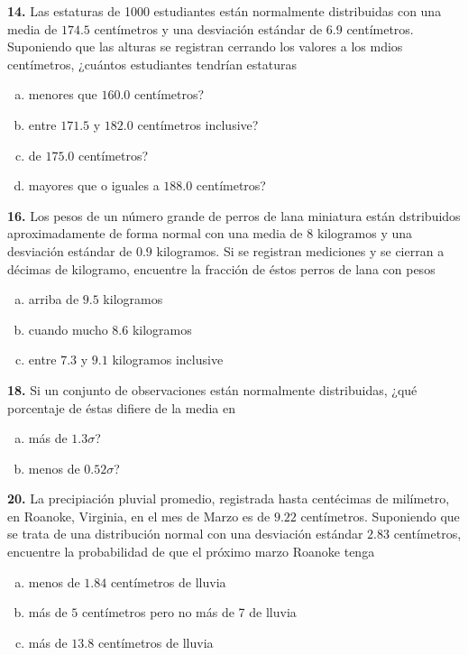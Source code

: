 \documentclass[12pt, letterpaper]{article}
\begin{document}
    \textbf{14. }Las estaturas de 1000 estudiantes están normalmente distribuidas con una media de $174.5$ centímetros y
    una desviación estándar de $6.9$ centímetros. Suponiendo  que las alturas se registran cerrando los valores a los mdios
    centímetros, ¿cuántos estudiantes tendrían estaturas
        \begin{enumerate}[a)]
            \item menores que $160.0$ centímetros?
            \item entre $171.5$ y $182.0$ centímetros inclusive?
            \item de $175.0$ centímetros?
            \item mayores que o iguales a $188.0$ centímetros?
        \end{enumerate}\vskip1cm

    \textbf{16. }Los pesos de un número grande de perros de lana miniatura están dstribuidos aproximadamente de forma normal
    con una media de $8$ kilogramos y  una desviación estándar de $0.9$ kilogramos. Si se registran mediciones y se cierran
    a décimas de kilogramo, encuentre la fracción de éstos perros de lana con pesos
        \begin{enumerate}[a)]
            \item arriba de $9.5$ kilogramos
            \item cuando mucho $8.6$ kilogramos
            \item entre $7.3$ y $9.1$ kilogramos inclusive
        \end{enumerate}\vskip1cm

    \textbf{18. }Si un conjunto de observaciones están normalmente distribuidas, ¿qué porcentaje de éstas difiere de la
    media en
        \begin{enumerate}[a)]
            \item más de $1.3\sigma$?
            \item menos de $0.52\sigma$?
        \end{enumerate}\vskip1cm

    \textbf{20. }La precipiación pluvial promedio, registrada hasta centécimas de milímetro, en Roanoke, Virginia, en el
    mes de Marzo es de $9.22$ centímetros. Suponiendo que se trata de una distribución normal con una desviación estándar
    $2.83$ centímetros, encuentre la probabilidad de que el próximo marzo Roanoke tenga
        \begin{enumerate}[a)]
            \item menos de $1.84$ centímetros de lluvia
            \item más de $5$ centímetros pero no más de 7 de lluvia
            \item más de $13.8$ centímetros de lluvia
        \end{enumerate}\vskip1cm
\end{document}
